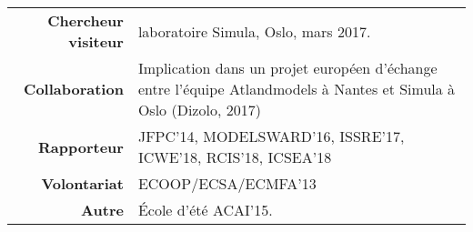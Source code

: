 \documentclass{article} %
\begin{document}
\begin{tabular}{r @{~$\rangle$~} p{}}

{\bf Chercheur visiteur} & laboratoire Simula, Oslo, mars 2017. \\

{\bf Collaboration} & Implication dans un projet européen d'échange entre l'équipe Atlandmodels à Nantes et Simula à Oslo (Dizolo, 2017) \\

{\bf Rapporteur} & JFPC'14, MODELSWARD'16, ISSRE'17, ICWE'18, RCIS'18, ICSEA'18 \\

{\bf Volontariat} & ECOOP/ECSA/ECMFA'13 \\

{\bf Autre} & École d'été ACAI'15. \\

\end{tabular}








\end{document}
